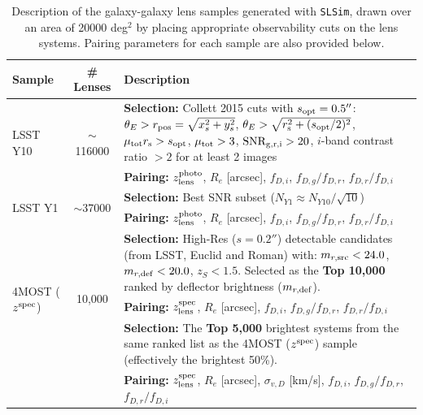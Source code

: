 \documentclass[a4paper,11pt]{article}
\begin{document}
\begin{table}[ht]
    \centering
    \caption{Description of the galaxy-galaxy lens samples generated with \texttt{SLSim}, drawn over an area of 20000 deg$^2$ by placing appropriate observability cuts on the lens systems. Pairing parameters for each sample are also provided below.}\vspace{1em}
    \label{tab:slsim_ggl_samples}
    \renewcommand{\arraystretch}{1.4} %
    \begin{tabular}{l c p{8.6cm}}
    \hline
    \textbf{Sample} & \textbf{\# Lenses} & \textbf{Description} \\
    \hline
    
    \multirow{2}{*}{LSST Y10} & 
    \multirow{2}{*}{$\sim$116000} & 
    \textbf{Selection:} Collett 2015 \cite{Collett:2015} cuts with $s_{\rm opt} = 0.5''$: \newline
    $\theta_E > r_{\rm pos} = \sqrt{x_s^2 + y_s^2}$, \quad $\theta_E > \sqrt{r_{\rm s}^2 + (s_{\rm opt}/2)^2}$, \quad $\mu_{\rm tot} r_{\rm s} > s_{\rm opt}$, \quad
    $\mu_{\rm tot} > 3$, \quad ${\rm SNR_{g, r, i}} > 20$, \quad $i$-band contrast ratio $> 2$ for at least 2 images \\
     & & \textbf{Pairing:} $z_{\mathrm{lens}}^{\rm photo}$, $R_e$ [arcsec], $f_{D,i}$, $f_{D,g}/f_{D,r}$, $f_{D,r}/f_{D,i}$ \\
    \hline

    \multirow{2}{*}{LSST Y1} & 
    \multirow{2}{*}{$\sim$37000} & 
    \textbf{Selection:} Best SNR subset ($N_{Y1} \approx N_{Y10}/\sqrt{10}$) \\
     & & \textbf{Pairing:} $z_{\mathrm{lens}}^{\rm photo}$, $R_e$ [arcsec], $f_{D,i}$, $f_{D,g}/f_{D,r}$, $f_{D,r}/f_{D,i}$ \\
    \hline

    \multirow{3}{*}{{4MOST ($z^{\rm spec}$)}} & 
    \multirow{3}{*}{10,000} & 
    \textbf{Selection:} High-Res ($s=0.2''$) detectable candidates (from LSST, Euclid and Roman) with: \newline
    $m_{r, \rm src} < 24.0$, \quad $m_{r, \rm def} < 20.0$, \quad $z_S < 1.5$. \newline
    Selected as the \textbf{Top 10,000} ranked by deflector brightness ($m_{r, \rm def}$). \\
     & & \textbf{Pairing:} $z_{\mathrm{lens}}^{\rm spec}$, $R_e$ [arcsec], $f_{D,i}$, $f_{D,g}/f_{D,r}$, $f_{D,r}/f_{D,i}$ \\
    \hline

    \multirow{3}{*}{{4MOST ($z^{\rm spec} + \sigma_{v, D}$)}} & 
    \multirow{3}{*}{5,000} & 
    \textbf{Selection:} The \textbf{Top 5,000} brightest systems from the same ranked list as the 4MOST ($z^{\rm spec}$) sample (effectively the brightest 50\%). \\
     & & \textbf{Pairing:} $z_{\mathrm{lens}}^{\rm spec}$, $R_e$ [arcsec], $\sigma_{v, D}$ [km/s], $f_{D,i}$, $f_{D,g}/f_{D,r}$, $f_{D,r}/f_{D,i}$ \\
    \hline
    \end{tabular}
\end{table}
\end{document}
